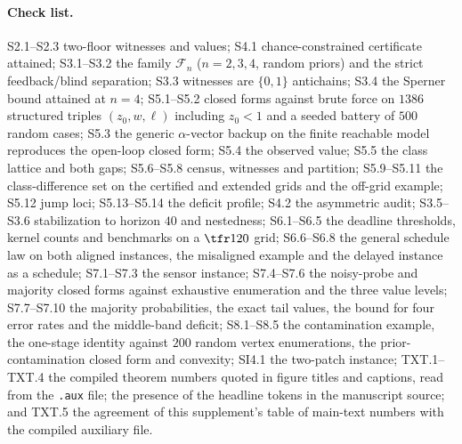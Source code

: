 \paragraph{Check list.} S2.1--S2.3 two-floor witnesses and values; S4.1 chance-constrained certificate attained; S3.1--S3.2 the family $\mathcal F_n$ ($n=2,3,4$, random priors) and the strict feedback/blind separation; S3.3 witnesses are $\{0,1\}$ antichains; S3.4 the Sperner bound attained at $n=4$; S5.1--S5.2 closed forms against brute force on $1386$ structured triples $(z_0,w,\ell)$ including $z_0<1$ and a seeded battery of $500$ random cases; S5.3 the generic $\alpha$-vector backup on the finite reachable model reproduces the open-loop closed form; S5.4 the observed value; S5.5 the class lattice and both gaps; S5.6--S5.8 census, witnesses and partition; S5.9--S5.11 the class-difference set on the certified and extended grids and the off-grid example; S5.12 jump loci; S5.13--S5.14 the deficit profile; S4.2 the asymmetric audit; S3.5--S3.6 stabilization to horizon $40$ and nestedness; S6.1--S6.5 the deadline thresholds, kernel counts and benchmarks on a $\tfr1{20}$ grid; S6.6--S6.8 the general schedule law on both aligned instances, the misaligned example and the delayed instance as a schedule; S7.1--S7.3 the sensor instance; S7.4--S7.6 the noisy-probe and majority closed forms against exhaustive enumeration and the three value levels; S7.7--S7.10 the majority probabilities, the exact tail values, the bound for four error rates and the middle-band deficit; S8.1--S8.5 the contamination example, the one-stage identity against $200$ random vertex enumerations, the prior-contamination closed form and convexity; SI4.1 the two-patch instance; TXT.1--TXT.4 the compiled theorem numbers quoted in figure titles and captions, read from the \texttt{.aux} file; the presence of the headline tokens in the manuscript source; and TXT.5 the agreement of this supplement's table of main-text numbers with the compiled auxiliary file.

